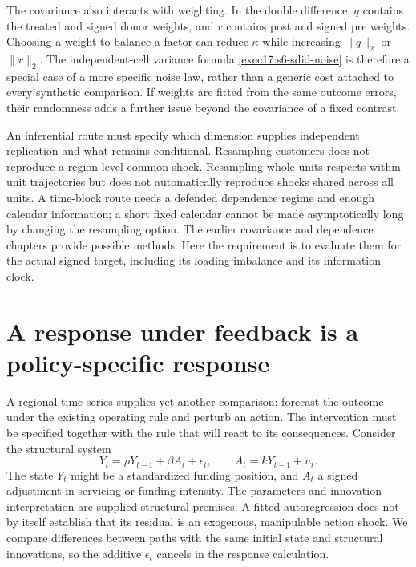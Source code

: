 The covariance also interacts with weighting. In the double difference,
$q$ contains the treated and signed donor weights, and $r$ contains
post and signed pre weights. Choosing a weight to balance a factor can
reduce $\kappa$ while increasing $\|q\|_2$ or $\|r\|_2$.
The independent-cell variance formula
\eqref{exec17:s6-sdid-noise} is therefore a special case of a more
specific noise law, rather than a generic cost attached to every
synthetic comparison. If weights are fitted from the same outcome
errors, their randomness adds a further issue beyond the covariance
of a fixed contrast.

An inferential route must specify which dimension supplies independent
replication and what remains conditional. Resampling customers does not
reproduce a region-level common shock. Resampling whole units respects
within-unit trajectories but does not automatically reproduce shocks
shared across all units. A time-block route needs a defended dependence
regime and enough calendar information; a short fixed calendar cannot
be made asymptotically long by changing the resampling option. The
earlier covariance and dependence chapters provide possible methods.
Here the requirement is to evaluate them for the actual signed target,
including its loading imbalance and its information clock.

\section{A response under feedback is a policy-specific response}
\label{exec17:s6-feedback}

A regional time series supplies yet another comparison: forecast the outcome
under the existing operating rule and perturb an action. The intervention must
be specified together with the rule that will react to its consequences.
Consider the structural system
\begin{equation}
 Y_t=\rho Y_{t-1}+\beta A_t+\epsilon_t,\qquad
 A_t=kY_{t-1}+u_t.
 \label{exec17:s6-feedback-law}
\end{equation}
The state $Y_t$ might be a standardized funding position, and $A_t$ a
signed adjustment in servicing or funding intensity. The parameters and
innovation interpretation are supplied structural premises. A fitted
autoregression does not by itself establish that its residual is an
exogenous, manipulable action shock. We compare differences between paths
with the same initial state and structural innovations, so the additive
$\epsilon_t$ cancels in the response calculation.

